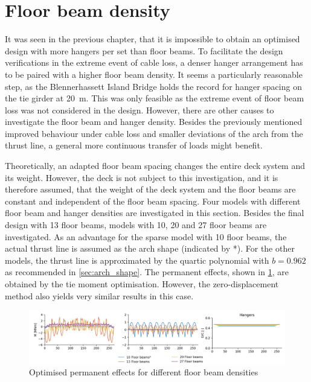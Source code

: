 \section{Floor beam density} \label{sec:floor_beam_density}
It was seen in the previous chapter, that it is impossible to obtain an optimised design with more hangers per set than floor beams. To facilitate the design verifications in the extreme event of cable loss, a denser hanger arrangement has to be paired with a higher floor beam density. It seems a particularly reasonable step, as the Blennerhassett Island Bridge holds the record for hanger spacing on the tie girder at \SI{20}{m}. This was only feasible as the extreme event of floor beam loss was not considered in the design. However, there are other causes to investigate the floor beam and hanger density. Besides the previously mentioned improved behaviour under cable loss and smaller deviations of the arch from the thrust line, a general more continuous transfer of loads might benefit. \medskip

Theoretically, an adapted floor beam spacing changes the entire deck system and its weight. However, the deck is not subject to this investigation, and it is therefore assumed, that the weight of the deck system and the floor beams are constant and independent of the floor beam spacing. Four models with different floor beam and hanger densities are investigated in this section. Besides the final design with 13 floor beams, models with 10, 20 and 27 floor beams are investigated. As an advantage for the sparse model with 10 floor beams, the actual thrust line is assumed as the arch shape (indicated by *). For the other models, the thrust line is approximated by the quartic polynomial with $b=0.962$ as recommended in \cref{sec:arch_shape}. The permanent effects, shown in \cref{fig:fb_permanent}, are obtained by the tie moment optimisation. However, the zero-displacement method also yields very similar results in this case.

\begin{figure}[H]
    \centering
    \includegraphics[trim={0 0 1cm 0},clip, width=\textwidth]{calculations/floor beam density/permanent_plot.png}
    \caption{Optimised permanent effects for different floor beam densities}
    \label{fig:fb_permanent}
\end{figure}


